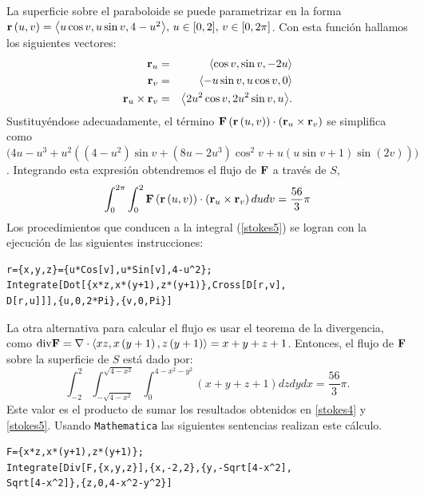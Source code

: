 La superficie sobre el paraboloide se puede parametrizar en la forma
${\bf r}\left(u,v\right) =\left\langle u\cos v,u\sin v,4-u^{2}\right\rangle\!,\, u\in \lbrack 0,2],\, v\in \lbrack 0,2\pi ]$.
Con esta función hallamos los siguientes vectores:
\begin{eqnarray*}
{\bf r}_{u}&=& \left\langle \cos v,\sin v,-2u\right\rangle \\
{\bf r}_{v} &=& \left\langle -u\sin v,u\cos v,0\right\rangle \\
{\bf r}_{u}\times {\bf r}_{v} &=& \left\langle 2u^{2}\cos v,2u^{2}\sin v,u\right\rangle\!.
\end{eqnarray*}
Sustituyéndose adecuadamente, el término ${\bf F}\left({\bf r}\left(u,v\right)\right) \cdot \left({\bf r}_{u}\times {\bf r}_{v}\right)$ se simplifica como
$\big(4u-u^{3}+u^{2}((4-u^{2}) \sin v+(8u-2u^{3})\cos^{2}v +u(u\sin v+1) \sin (2v))\big)$.
Integrando esta expresión obtendremos el flujo de ${\bf F}$ a través de $S$,
\begin{equation} \label{stokes5}
\int_{0}^{2\pi }\int_{0}^{2}{\bf F}\left({\bf r}\left(u,v\right)\right) \cdot \left({\bf r}_{u}\times {\bf r}_{v}\right) dudv= \frac{56}{3}\pi
\end{equation}
Los procedimientos que conducen a la integral (\ref{stokes5}) se logran con la ejecución de las siguientes instrucciones:

\begin{tcolorbox}[title=\bf Instrucción \verb"Mathematica"]\begin{Verbatim}[formatcom=\letraverbatim]
r={x,y,z}={u*Cos[v],u*Sin[v],4-u^2};
Integrate[Dot[{x*z,x*(y+1),z*(y+1)},Cross[D[r,v],
D[r,u]]],{u,0,2*Pi},{v,0,Pi}]
\end{Verbatim}
\end{tcolorbox}

La otra alternativa para calcular el flujo es usar el teorema de la divergencia, como ${\rm div}{\bf F}=\nabla \cdot \left\langle xz,x\left( y+1\right) ,z\left( y+1\right) \right\rangle = x+y+z+1$.
Entonces, el flujo de ${\bf F}$ sobre la superficie de $S$ está dado por:
\[\int_{-2}^{2}\int_{-\sqrt{4-x^{2}}}^{\sqrt{4-x^{2}}}\int_{0}^{4-x^{2}-y^{2}}\left( x+y+z+1\right) dzdydx= \frac{56}{3}\pi.\]
Este valor es el producto de sumar los resultados obtenidos en \ref{stokes4} y \ref{stokes5}.
Usando \verb"Mathematica" las siguientes sentencias realizan este cálculo.

\begin{tcolorbox}[title=\bf Instrucción \verb"Mathematica"]\begin{Verbatim}[formatcom=\letraverbatim]
F={x*z,x*(y+1),z*(y+1)};
Integrate[Div[F,{x,y,z}],{x,-2,2},{y,-Sqrt[4-x^2],
Sqrt[4-x^2]},{z,0,4-x^2-y^2}]
\end{Verbatim}
\end{tcolorbox}

